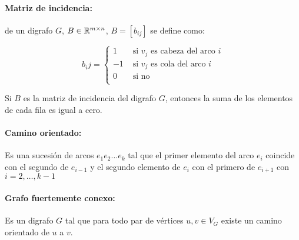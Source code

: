 \paragraph{Matriz de incidencia:} de un digrafo \(G\), \(B\in\mathbb{R}^{m\times n}\), \(B = [b_{ij}]\) se define como:

\[b_ij = \begin{cases}
1 & \text{ si } v_j \text{ es cabeza del arco } i \\
-1 & \text{ si } v_j \text{ es cola del arco } i \\
0 & \text{ si no } \\
\end{cases}\]

\begin{proposicion}
	Si \(B\) es la matriz de incidencia del digrafo \(G\), entonces la suma de los elementos de cada fila es igual a cero.
\end{proposicion}

\paragraph{Camino orientado:} Es una sucesión de arcos \(e_1e_2\dots e_k\) tal que el primer elemento del arco \(e_i\) coincide con el segundo de \(e_{i-1}\) y el segundo elemento de \(e_i\) con el primero de \(e_{i+1}\) con \(i = 2,\dots,k-1\)

\paragraph{Grafo fuertemente conexo:} Es un digrafo \(G\) tal que para todo par de vértices \(u,v\in 	V_G\) existe un camino orientado de \(u\) a \(v\).
